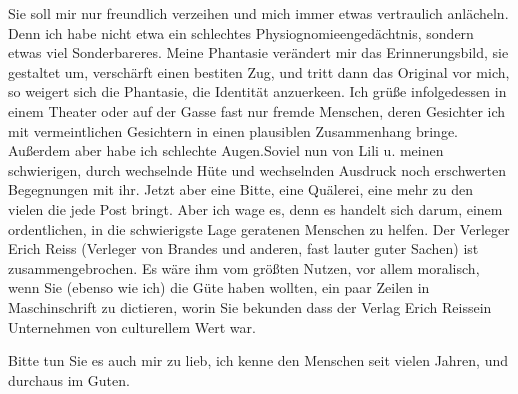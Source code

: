 \pstart
           Sie soll mir nur freundlich verzeihen und mich immer etwas vertraulich anlächeln.
               Denn ich habe nicht etwa ein schlechtes Physiognomieengedächtnis, sondern etwas viel
               Sonderbareres. Meine Phantasie verändert mir das Erinnerungsbild, sie gestaltet um,
               verschärft einen besti{\geminationm}ten Zug, und tritt dann das
               Original vor mich, so weigert sich die Phantasie, die Identität anzuerke{\geminationn}en. Ich grüße infolgedessen in einem Theater oder auf
               der Gasse fast nur fremde Menschen, deren Gesichter ich mit vermeintlichen Gesichtern
               in einen plausiblen {\pb}Zusammenhang
               bringe. Außerdem aber habe ich schlechte Augen.\hspace*{1.5em}Soviel nun von Lili u. meinen schwierigen,
               durch wechselnde Hüte und wechselnden Ausdruck noch erschwerten Begegnungen mit ihr.
               Jetzt aber eine Bitte, eine Quälerei, eine mehr zu den vielen die jede Post bringt.
               Aber ich wage es, denn es handelt sich darum, einem ordentlichen, in die schwierigste
               Lage geratenen Menschen zu helfen. Der Verleger Erich Reiss (Verleger von Brandes und
               anderen, fast lauter guter Sachen) ist zusammengebrochen. Es wäre ihm vom größten
               Nutzen, vor allem moralisch, wenn Sie (ebenso wie ich) die Güte haben wollten, ein
               paar Zeilen in Maschinschrift zu dictieren, worin Sie bekunden dass der Verlag Erich Reissein Unternehmen von culturellem
               Wert war.\pend
           
\pstart
           Bitte tun Sie es auch mir zu lieb, ich kenne den Menschen seit vielen Jahren, und
               durchaus im Guten.\pend
           
